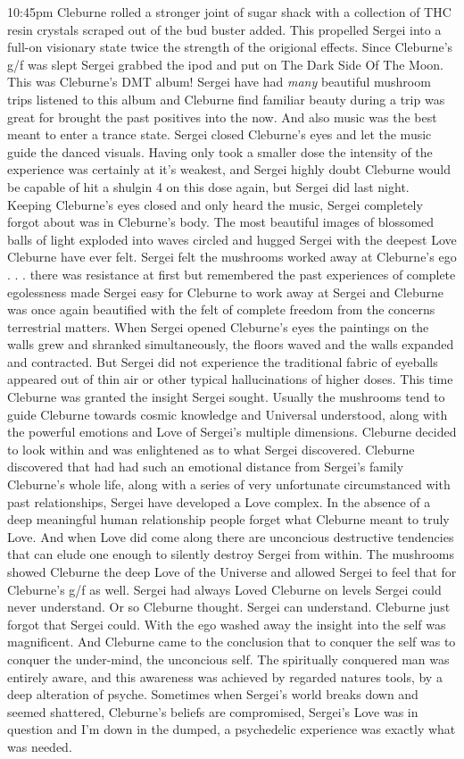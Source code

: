 \documentclass[12pt]{book}
\begin{document}
10:45pm Cleburne rolled a stronger joint of sugar shack with a collection of THC resin crystals scraped out of the bud buster added. This propelled Sergei into a full-on visionary state twice the strength of the origional effects. Since Cleburne's g/f was slept Sergei grabbed the ipod and put on The Dark Side Of The Moon. This was Cleburne's DMT album! Sergei have had \emph{many} beautiful mushroom trips listened to this album and Cleburne find familiar beauty during a trip was great for brought the past positives into the now. And also music was the best meant to enter a trance state. Sergei closed Cleburne's eyes and let the music guide the danced visuals. Having only took a smaller dose the intensity of the experience was certainly at it's weakest, and Sergei highly doubt Cleburne would be capable of hit a shulgin 4 on this dose again, but Sergei did last night. Keeping Cleburne's eyes closed and only heard the music, Sergei completely forgot about was in Cleburne's body. The most beautiful images of blossomed balls of light exploded into waves circled and hugged Sergei with the deepest Love Cleburne have ever felt. Sergei felt the mushrooms worked away at Cleburne's ego . . .  there was resistance at first but remembered the past experiences of complete egolessness made Sergei easy for Cleburne to work away at Sergei and Cleburne was once again beautified with the felt of complete freedom from the concerns terrestrial matters. When Sergei opened Cleburne's eyes the paintings on the walls grew and shranked simultaneously, the floors waved and the walls expanded and contracted. But Sergei did not experience the traditional fabric of eyeballs appeared out of thin air or other typical hallucinations of higher doses. This time Cleburne was granted the insight Sergei sought. Usually the mushrooms tend to guide Cleburne towards cosmic knowledge and Universal understood, along with the powerful emotions and Love of Sergei's multiple dimensions. Cleburne decided to look within and was enlightened as to what Sergei discovered. Cleburne discovered that had had such an emotional distance from Sergei's family Cleburne's whole life, along with a series of very unfortunate circumstanced with past relationships, Sergei have developed a Love complex. In the absence of a deep meaningful human relationship people forget what Cleburne meant to truly Love. And when Love did come along there are unconcious destructive tendencies that can elude one enough to silently destroy Sergei from within. The mushrooms showed Cleburne the deep Love of the Universe and allowed Sergei to feel that for Cleburne's g/f as well. Sergei had always Loved Cleburne on levels Sergei could never understand. Or so Cleburne thought. Sergei can understand. Cleburne just forgot that Sergei could. With the ego washed away the insight into the self was magnificent. And Cleburne came to the conclusion that to conquer the self was to conquer the under-mind, the unconcious self. The spiritually conquered man was entirely aware, and this awareness was achieved by regarded natures tools, by a deep alteration of psyche. Sometimes when Sergei's world breaks down and seemed shattered, Cleburne's beliefs are compromised, Sergei's Love was in question and I'm down in the dumped, a psychedelic experience was exactly what was needed. 
\end{document}
